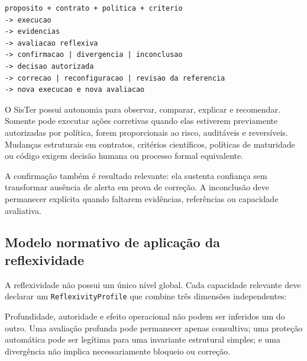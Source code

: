 \documentclass[11pt,a4paper,oneside]{article}
\begin{document}
\begin{lstlisting}
proposito + contrato + politica + criterio
-> execucao
-> evidencias
-> avaliacao reflexiva
-> confirmacao | divergencia | inconclusao
-> decisao autorizada
-> correcao | reconfiguracao | revisao da referencia
-> nova execucao e nova avaliacao
\end{lstlisting}

\begin{decisao}
O SisTer possui autonomia para observar, comparar, explicar e recomendar. Somente pode executar ações corretivas quando elas estiverem previamente autorizadas por política, forem proporcionais ao risco, auditáveis e reversíveis. Mudanças estruturais em contratos, critérios científicos, políticas de maturidade ou código exigem decisão humana ou processo formal equivalente.
\end{decisao}

A confirmação também é resultado relevante: ela sustenta confiança sem transformar ausência de alerta em prova de correção. A inconclusão deve permanecer explícita quando faltarem evidências, referências ou capacidade avaliativa.


\subsection{Modelo normativo de aplicação da reflexividade}
\label{sec:modelo-reflexividade}

A reflexividade não possui um único nível global. Cada capacidade relevante deve declarar um \texttt{ReflexivityProfile} que combine três dimensões independentes:

\begin{center}
\end{center}

\begin{decisao}
Profundidade, autoridade e efeito operacional não podem ser inferidos um do outro. Uma avaliação profunda pode permanecer apenas consultiva; uma proteção automática pode ser legítima para uma invariante estrutural simples; e uma divergência não implica necessariamente bloqueio ou correção.
\end{decisao}
\end{document}
